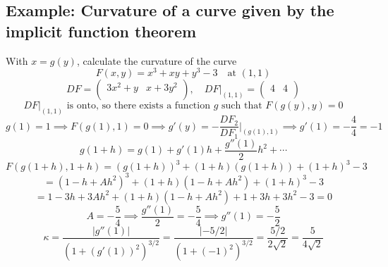 \documentclass[11pt]{article}
\begin{document}
\subsection*{Example: Curvature of a curve given by the implicit function theorem}
With $x = g(y)$, calculate the curvature of the curve
\[
F(x,y) = x^3 + xy + y^3 - 3 \quad \text{at } (1,1)
\]
\[
DF = \begin{pmatrix}
    3x^2 + y & x + 3y^2 \\
\end{pmatrix}, \quad DF\big|_{(1,1)} = \begin{pmatrix}
    4 & 4 \\
\end{pmatrix}
\]
\[
DF\big|_{(1,1)} \text{ is onto, so there exists a function } g \text{ such that } F(g(y),y) = 0
\]
\[
g(1) = 1 \implies F(g(1),1) = 0 \implies g'(y) = -\frac{DF_2}{DF_1} \big|_{(g(1),1)} \implies g'(1) = -\frac{4}{4} = -1
\]
\[
g(1 + h) = g(1) + g'(1)h + \frac{g''(1)}{2}h^2 + \cdots
\]
\[
F(g(1 + h), 1 + h) = (g(1 + h))^3 + (1 + h)(g(1 + h)) + (1 + h)^3 - 3
\]
\[
= (1 - h + Ah^2)^3 + (1 + h)(1 - h + Ah^2) + (1 + h)^3 - 3
\]
\[
= 1 - 3h + 3Ah^2 + (1 + h)(1 - h + Ah^2) + 1 + 3h + 3h^2 - 3 = 0
\]
\[
A = - \frac{5}{4} \implies \frac{g''(1)}{2} = -\frac{5}{4} \implies g''(1) = -\frac{5}{2}
\]
\[
\kappa = \frac{|g''(1)|}{(1 + (g'(1))^2)^{3/2}} = \frac{|-5/2|}{(1 + (-1)^2)^{3/2}} = \frac{5/2}{2\sqrt{2}} = \frac{5}{4\sqrt{2}}
\]
\end{document}
